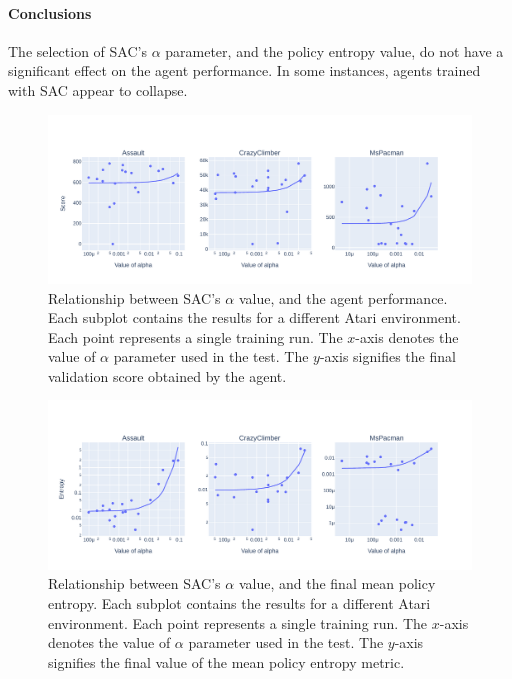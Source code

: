 \documentclass[en]{pracamgr}
\newcommand{\figurewidth}{\linewidth}
\newcommand{\figureheight}{0.8\paperheight}
\begin{document}
\paragraph{Conclusions} The selection of SAC's $\alpha$ parameter, and the policy entropy value, do not have a significant effect on the agent performance. In some instances, agents trained with SAC appear to collapse.

\begin{figure}
  \centering
  \includegraphics[width=\figurewidth,height=\figureheight,keepaspectratio]{assets/sac.alpha_perf.pdf}
  \caption{Relationship between SAC's $\alpha$ value, and the agent performance. Each subplot contains the results for a different Atari environment. Each point represents a single training run. The $x$-axis denotes the value of $\alpha$ parameter used in the test. The $y$-axis signifies the final validation score obtained by the agent.}
  \label{fig:sac_alpha_perf}
\end{figure}

\begin{figure}
  \centering
  \includegraphics[width=\figurewidth,height=\figureheight,keepaspectratio]{assets/sac.alpha_ent.pdf}
  \caption{Relationship between SAC's $\alpha$ value, and the final mean policy entropy. Each subplot contains the results for a different Atari environment. Each point represents a single training run. The $x$-axis denotes the value of $\alpha$ parameter used in the test. The $y$-axis signifies the final value of the mean policy entropy metric.}
  \label{fig:sac_alpha_ent}
\end{figure}
\end{document}
